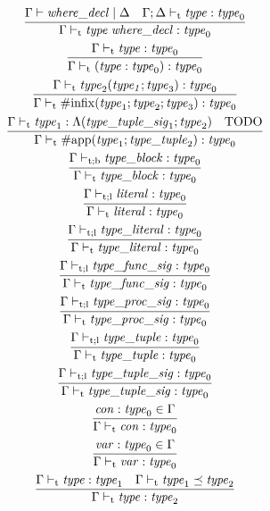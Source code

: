 \begin{gather*}
    \infer{\Gamma \vdash_\mathrm{t} \mathit{type}\; \mathit{where\_decl}: \mathit{type}_0}{
        \Gamma \vdash \mathit{where\_decl} \mid \Delta
        &
        \Gamma; \Delta \vdash_\mathrm{t} \mathit{type}: \mathit{type}_0
    }
    \\
    \infer{\Gamma \vdash_\mathrm{t} (\mathit{type}: \mathit{type}_0): \mathit{type}_0}{
        \Gamma \vdash_\mathrm{t} \mathit{type}: \mathit{type}_0
    }
    \\
    \infer{\Gamma \vdash_\mathrm{t} \mathrm{\#infix}(\mathit{type}_1; \mathit{type}_2; \mathit{type}_3): \mathit{type}_0}{
        \Gamma \vdash_\mathrm{t} \mathit{type}_2(\mathit{type_1}; \mathit{type}_3): \mathit{type}_0
    }
    \\
    \infer{\Gamma \vdash_\mathrm{t} \mathrm{\#app}(\mathit{type}_1; \mathit{type\_tuple}_2): \mathit{type}_0}{
        \Gamma \vdash_\mathrm{t} \mathit{type}_1: \Lambda(\mathit{type\_tuple\_sig}_1; \mathit{type}_2)
        &
        \text{TODO}
    }
    \\
    \infer{\Gamma \vdash_\mathrm{t} \mathit{type\_block}: \mathit{type}_0}{
        \Gamma \vdash_{\mathrm{t}; \mathrm{b}} \mathit{type\_block}: \mathit{type}_0
    }
    \\
    \infer{\Gamma \vdash_\mathrm{t} \mathit{literal}: \mathit{type}_0}{
        \Gamma \vdash_{\mathrm{t}; \mathrm{l}} \mathit{literal}: \mathit{type}_0
    }
    \\
    \infer{\Gamma \vdash_\mathrm{t} \mathit{type\_literal}: \mathit{type}_0}{
        \Gamma \vdash_{\mathrm{t}; \mathrm{l}} \mathit{type\_literal}: \mathit{type}_0
    }
    \\
    \infer{\Gamma \vdash_\mathrm{t} \mathit{type\_func\_sig}: \mathit{type}_0}{
        \Gamma \vdash_{\mathrm{t}; \mathrm{l}} \mathit{type\_func\_sig}: \mathit{type}_0
    }
    \\
    \infer{\Gamma \vdash_\mathrm{t} \mathit{type\_proc\_sig}: \mathit{type}_0}{
        \Gamma \vdash_{\mathrm{t}; \mathrm{l}} \mathit{type\_proc\_sig}: \mathit{type}_0
    }
    \\
    \infer{\Gamma \vdash_\mathrm{t} \mathit{type\_tuple}: \mathit{type}_0}{
        \Gamma \vdash_{\mathrm{t}; \mathrm{l}} \mathit{type\_tuple}: \mathit{type}_0
    }
    \\
    \infer{\Gamma \vdash_\mathrm{t} \mathit{type\_tuple\_sig}: \mathit{type}_0}{
        \Gamma \vdash_{\mathrm{t}; \mathrm{l}} \mathit{type\_tuple\_sig}: \mathit{type}_0
    }
    \\
    \infer{\Gamma \vdash_\mathrm{t} \mathit{con}: \mathit{type}_0}{
        \mathit{con}: \mathit{type}_0 \in \Gamma
    }
    \\
    \infer{\Gamma \vdash_\mathrm{t} \mathit{var}: \mathit{type}_0}{
        \mathit{var}: \mathit{type}_0 \in \Gamma
    }
    \\
    \infer{\Gamma \vdash_\mathrm{t} \mathit{type}: \mathit{type}_2}{
        \Gamma \vdash_\mathrm{t} \mathit{type}: \mathit{type}_1
        &
        \Gamma \vdash_\mathrm{t} \mathit{type}_1 \preceq \mathit{type}_2
    }
\end{gather*}

